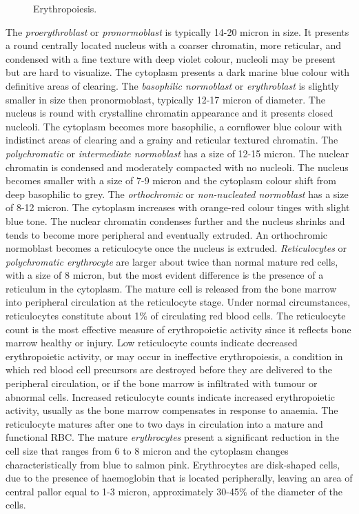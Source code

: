 \documentclass[final,a4paper,12pt,english]{UnicaPhdThesis3}
\begin{document}
	\begin{figure}[!htbp]
		\centering
		\caption{\label{fig:Erythropoiesis} Erythropoiesis.}
	\end{figure}
	
	The \textit{proerythroblast} or \textit{pronormoblast} is typically 14-20 micron in size. It presents a round centrally located nucleus with a coarser chromatin, more reticular, and condensed with a fine texture with deep violet colour, nucleoli may be present but are hard to visualize. The cytoplasm presents a dark marine blue colour with definitive areas of clearing. The \textit{basophilic normoblast} or \textit{erythroblast} is slightly smaller in size then pronormoblast, typically 12-17 micron of diameter. The nucleus is round with crystalline chromatin appearance and it presents closed nucleoli. The cytoplasm becomes more basophilic, a cornflower blue colour with indistinct areas of clearing and a grainy and reticular textured chromatin. The \textit{polychromatic} or \textit{intermediate normoblast} has a size of 12-15 micron. The nuclear chromatin is condensed and moderately compacted with no nucleoli. The nucleus becomes smaller with a size of 7-9 micron and the cytoplasm colour shift from deep basophilic to grey. The \textit{orthochromic} or \textit{non-nucleated normoblast} has a size of 8-12 micron. The cytoplasm increases with orange-red colour tinges with slight blue tone. The nuclear chromatin condenses further and the nucleus shrinks and tends to become more peripheral and eventually extruded. An orthochromic normoblast becomes a reticulocyte once the nucleus is extruded. \textit{Reticulocytes} or \textit{polychromatic erythrocyte} are larger about twice than normal mature red cells, with a size of 8 micron, but the most evident difference is the presence of a reticulum in the cytoplasm. The mature cell is released from the bone marrow into peripheral circulation at the reticulocyte stage. Under normal circumstances, reticulocytes constitute about 1\% of circulating red blood cells. The reticulocyte count is the most effective measure of erythropoietic activity since it reflects bone marrow healthy or injury. Low reticulocyte counts indicate decreased erythropoietic activity, or may occur in ineffective erythropoiesis, a condition in which red blood cell precursors are destroyed before they are delivered to the peripheral circulation, or if the bone marrow is infiltrated with tumour or abnormal cells. Increased reticulocyte counts indicate increased erythropoietic activity, usually as the bone marrow compensates in response to anaemia. The reticulocyte matures after one to two days in circulation into a mature and functional RBC. The mature \textit{erythrocytes} present a significant reduction in the cell size that ranges from 6 to 8 micron and the cytoplasm changes characteristically from blue to salmon pink. Erythrocytes are disk-shaped cells, due to the presence of haemoglobin that is located peripherally, leaving an area of central pallor equal to 1-3 micron, approximately 30-45\% of the diameter of the cells. 
	
\end{document}
